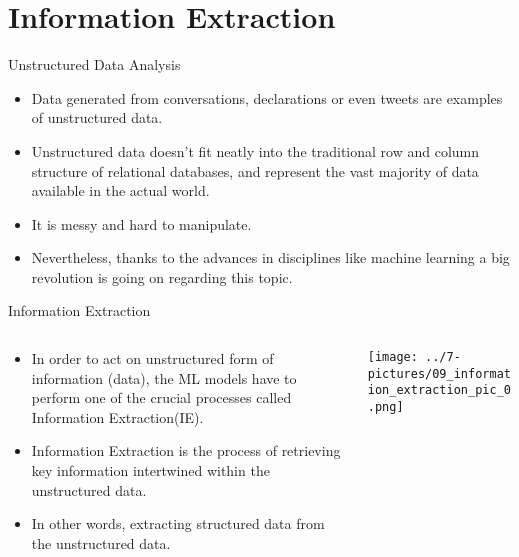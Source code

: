 \documentclass[11pt]{beamer}
\begin{document}
\section{Information Extraction}
\begin{frame}{Unstructured Data Analysis}
	\begin{itemize}
		\item Data generated from conversations, declarations or even tweets are examples of unstructured data. 
		\item Unstructured data doesn't fit neatly into the traditional row and column structure of relational databases, and represent the vast majority of data available in the actual world. 
		\item It is messy and hard to manipulate. 
		\item Nevertheless, thanks to the advances in disciplines like machine learning a big revolution is going on regarding this topic.
	\end{itemize}
\end{frame}
\begin{frame}{Information Extraction}
\begin{columns}[T] %
\begin{column}{.48\textwidth}
        \begin{itemize}
		\item In order to act on unstructured form of information (data), the ML models have to perform one of the crucial processes called Information Extraction(IE). 
		\item Information Extraction is the process of retrieving key information intertwined within the unstructured data. 
		\item In other words, extracting structured data from the unstructured data.
        \end{itemize}
\end{column}%
\hfill%
\begin{column}{.48\textwidth}
        \texttt{[image: ../7-pictures/09\_information\_extraction\_pic\_0.png]}
\end{column}%
\end{columns}
\end{frame}
\end{document}
